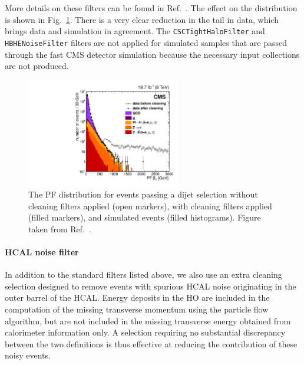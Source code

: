 More details on these filters can be found in Ref.~\cite{metfilters}. The effect on the \ETm
distribution is shown in Fig.~\ref{fig:event_metcleaning}. There is a very clear reduction in the
\ETm tail in data, which brings data and simulation in agreement. 
The {\tt CSCTightHaloFilter} and {\tt HBHENoiseFilter} filters are not applied for simulated samples
that are passed through the fast CMS detector simulation because the necessary input collections are
not produced.

\begin{figure}[tpb]
  \centering
  \includegraphics[width=0.6\textwidth]{figures/eventreco_objects/METTail}
  \caption{ The PF \VEtmiss distribution for events passing a dijet selection without cleaning
filters applied (open markers), with cleaning filters applied (filled markers), and simulated
events (filled histograms). Figure taken from Ref.~\cite{Khachatryan:2014gga}.
  \label{fig:event_metcleaning}}
\end{figure}

\paragraph{HCAL noise filter}

In addition to the standard filters listed above, we also use an extra cleaning selection designed
to remove events with spurious HCAL noise originating in the outer barrel of the HCAL. 
Energy deposits in the HO are included in the computation of the missing transverse momentum using 
the particle flow algorithm, but are not included in the missing transverse energy
obtained from calorimeter information only. 
A selection requiring no substantial discrepancy between the two \ETm definitions is thus effective
at reducing the contribution of these noisy events. 

